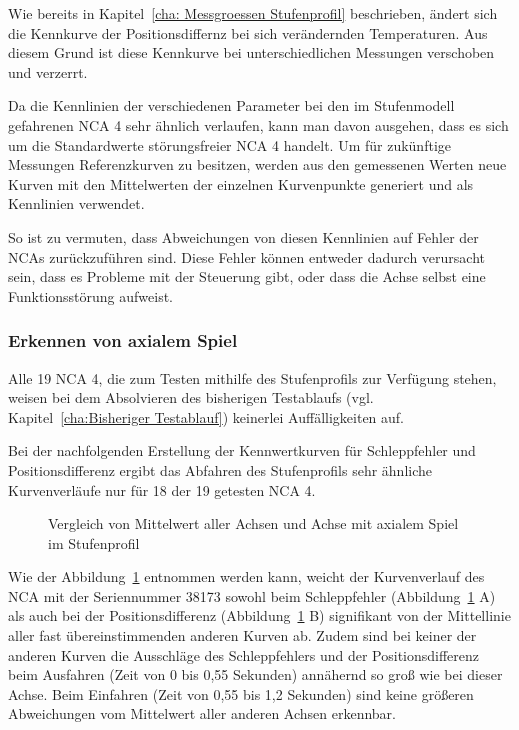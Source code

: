 Wie bereits in Kapitel~\ref{cha: Messgroessen Stufenprofil} beschrieben, ändert sich die Kennkurve der Positionsdiffernz bei sich verändernden Temperaturen. Aus diesem Grund ist diese Kennkurve bei unterschiedlichen Messungen verschoben und verzerrt.


Da die Kennlinien der verschiedenen Parameter bei den im Stufenmodell gefahrenen NCA 4 sehr ähnlich verlaufen, kann man davon ausgehen, dass es sich um die Standardwerte störungsfreier NCA 4 handelt. Um für zukünftige Messungen Referenzkurven zu besitzen, werden aus den gemessenen Werten neue Kurven mit den Mittelwerten der einzelnen Kurvenpunkte generiert und als Kennlinien verwendet. 


So ist zu vermuten, dass Abweichungen von diesen Kennlinien auf Fehler der NCAs zurückzuführen sind. Diese Fehler können entweder dadurch verursacht sein, dass es Probleme mit der Steuerung gibt, oder dass die Achse selbst eine Funktionsstörung aufweist.






\subsubsection{Erkennen von axialem Spiel} \label{cha:Fehlerermittlung von axialem Spiel Stufenprofil}

Alle 19 NCA 4, die zum Testen mithilfe des Stufenprofils zur Verfügung stehen, weisen bei dem Absolvieren des bisherigen Testablaufs (vgl. Kapitel~\ref{cha:Bisheriger Testablauf}) keinerlei Auffälligkeiten auf.

Bei der nachfolgenden Erstellung der Kennwertkurven für Schleppfehler und Positionsdifferenz ergibt das Abfahren des Stufenprofils sehr ähnliche Kurvenverläufe nur für 18 der 19 getesten NCA 4.

\begin{figure}[H]
\centering

\caption{Vergleich von Mittelwert aller Achsen und Achse mit axialem Spiel im Stufenprofil}
\label{fig:Vergleich von Mittelwert und Achse mit axialem Spiel}
\end{figure}



Wie der Abbildung~\ref{fig:Vergleich von Mittelwert und Achse mit axialem Spiel} entnommen werden kann, weicht der Kurvenverlauf des NCA mit der Seriennummer 38173 sowohl beim Schleppfehler (Abbildung~\ref{fig:Vergleich von Mittelwert und Achse mit axialem Spiel} A) als auch bei der Po\-si\-tions\-dif\-fe\-renz (Abbildung~\ref{fig:Vergleich von Mittelwert und Achse mit axialem Spiel} B) signifikant von der Mittellinie aller fast übereinstimmenden anderen Kurven ab. Zudem sind bei keiner der anderen Kurven die Ausschläge des Schleppfehlers und der Positionsdifferenz beim Ausfahren (Zeit von 0 bis 0,55 Sekunden) annähernd so groß wie bei dieser Achse. Beim Einfahren (Zeit von 0,55 bis 1,2 Sekunden) sind keine größeren Abweichungen vom Mittelwert aller anderen Achsen erkennbar.



